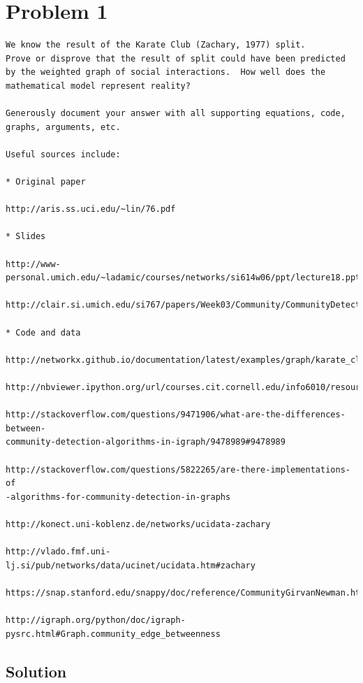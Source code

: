  
\section{Problem 1}
\label{part1}
\begin{verbatim}
We know the result of the Karate Club (Zachary, 1977) split.
Prove or disprove that the result of split could have been predicted
by the weighted graph of social interactions.  How well does the
mathematical model represent reality?

Generously document your answer with all supporting equations, code,
graphs, arguments, etc.

Useful sources include:

* Original paper

http://aris.ss.uci.edu/~lin/76.pdf

* Slides

http://www-personal.umich.edu/~ladamic/courses/networks/si614w06/ppt/lecture18.ppt

http://clair.si.umich.edu/si767/papers/Week03/Community/CommunityDetection.pptx

* Code and data

http://networkx.github.io/documentation/latest/examples/graph/karate_club.html

http://nbviewer.ipython.org/url/courses.cit.cornell.edu/info6010/resources/11notes.ipynb

http://stackoverflow.com/questions/9471906/what-are-the-differences-between-
community-detection-algorithms-in-igraph/9478989#9478989

http://stackoverflow.com/questions/5822265/are-there-implementations-of
-algorithms-for-community-detection-in-graphs

http://konect.uni-koblenz.de/networks/ucidata-zachary

http://vlado.fmf.uni-lj.si/pub/networks/data/ucinet/ucidata.htm#zachary

https://snap.stanford.edu/snappy/doc/reference/CommunityGirvanNewman.html

http://igraph.org/python/doc/igraph-pysrc.html#Graph.community_edge_betweenness

\end{verbatim}

\subsection{Solution}

